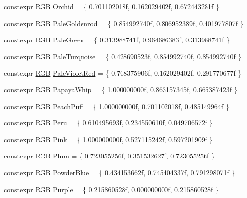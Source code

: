 \begin{DoxyCompactItemize}
constexpr \hyperlink{structmage_1_1_r_g_b}{R\+GB} \hyperlink{namespacemage_1_1color_a1659e10d131af787628e24db095a5c58}{Orchid} = \{ 0.\+701102018f, 0.\+162029402f, 0.\+672443281f \}
\item 
constexpr \hyperlink{structmage_1_1_r_g_b}{R\+GB} \hyperlink{namespacemage_1_1color_a504a28b76da12e65cc57019bc2481b6f}{Pale\+Goldenrod} = \{ 0.\+854992740f, 0.\+806952389f, 0.\+401977807f \}
\item 
constexpr \hyperlink{structmage_1_1_r_g_b}{R\+GB} \hyperlink{namespacemage_1_1color_a1e055d7a69c5f8f9ffdac938889e306a}{Pale\+Green} = \{ 0.\+313988741f, 0.\+964686383f, 0.\+313988741f \}
\item 
constexpr \hyperlink{structmage_1_1_r_g_b}{R\+GB} \hyperlink{namespacemage_1_1color_ad6ef41327e0e1d862f7b95324e93b4a1}{Pale\+Turquoise} = \{ 0.\+428690523f, 0.\+854992740f, 0.\+854992740f \}
\item 
constexpr \hyperlink{structmage_1_1_r_g_b}{R\+GB} \hyperlink{namespacemage_1_1color_a86d236f89e45680e1678c6d1e9a287bc}{Pale\+Violet\+Red} = \{ 0.\+708375906f, 0.\+162029402f, 0.\+291770677f \}
\item 
constexpr \hyperlink{structmage_1_1_r_g_b}{R\+GB} \hyperlink{namespacemage_1_1color_a209f72744c785cbc48f954bd42b35f79}{Papaya\+Whip} = \{ 1.\+000000000f, 0.\+863157345f, 0.\+665387423f \}
\item 
constexpr \hyperlink{structmage_1_1_r_g_b}{R\+GB} \hyperlink{namespacemage_1_1color_a6ec38a42d469de89ab50cd4db3338754}{Peach\+Puff} = \{ 1.\+000000000f, 0.\+701102018f, 0.\+485149964f \}
\item 
constexpr \hyperlink{structmage_1_1_r_g_b}{R\+GB} \hyperlink{namespacemage_1_1color_a6fada3c18d633306e50b65df7bf6c043}{Peru} = \{ 0.\+610495693f, 0.\+234550610f, 0.\+049706572f \}
\item 
constexpr \hyperlink{structmage_1_1_r_g_b}{R\+GB} \hyperlink{namespacemage_1_1color_ae16637717be4ec8fdf6991f24e5ccf27}{Pink} = \{ 1.\+000000000f, 0.\+527115242f, 0.\+597201909f \}
\item 
constexpr \hyperlink{structmage_1_1_r_g_b}{R\+GB} \hyperlink{namespacemage_1_1color_aa46d4f06d75baccba40c0b04ddb88775}{Plum} = \{ 0.\+723055256f, 0.\+351532627f, 0.\+723055256f \}
\item 
constexpr \hyperlink{structmage_1_1_r_g_b}{R\+GB} \hyperlink{namespacemage_1_1color_aa958d1e0bc2c4f67cdd4e74552d63600}{Powder\+Blue} = \{ 0.\+434153662f, 0.\+745404337f, 0.\+791298071f \}
\item 
constexpr \hyperlink{structmage_1_1_r_g_b}{R\+GB} \hyperlink{namespacemage_1_1color_af70cf4f9a882428e08cb958fe75a5a30}{Purple} = \{ 0.\+215860528f, 0.\+000000000f, 0.\+215860528f \}

\end{DoxyCompactItemize}
